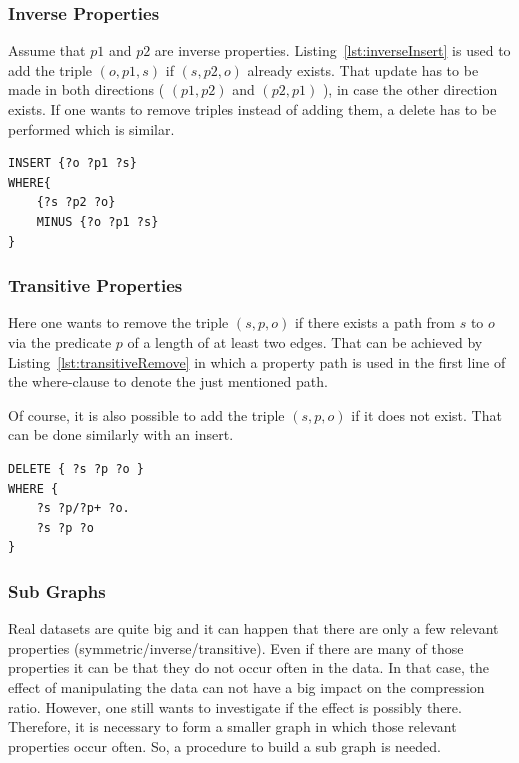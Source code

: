 \subsubsection{Inverse Properties}

Assume that $ p1 $ and $ p2 $ are inverse properties. Listing~\ref{lst:inverseInsert} is used to add the triple $(o,p1,s)$ if $(s,p2,o)$ already exists. That update has to be made in both directions ( $(p1,p2)$ and $(p2,p1)$ ), in case the other direction exists. If one wants to remove triples instead of adding them, a delete has to be performed which is similar.

\begin{lstlisting}[captionpos=b, caption=SPARQL update for adding triples with the inverse properties p1 and p2., label=lst:inverseInsert,
basicstyle=\ttfamily,frame=single]
INSERT {?o ?p1 ?s}
WHERE{
	{?s ?p2 ?o}
	MINUS {?o ?p1 ?s}
}
\end{lstlisting}

\subsubsection{Transitive Properties}

Here one wants to remove the triple $(s,p,o)$ if there exists a path from $s$ to $o$ via the predicate $p$ of a length of at least two edges. That can be achieved by Listing~\ref{lst:transitiveRemove} in which a property path is used in the first line of the where-clause to denote the just mentioned path.

Of course, it is also possible to add the triple $(s,p,o)$ if it does not exist. That can be done similarly with an insert.

\begin{lstlisting}[captionpos=b, caption=SPARQL update for removing triples with the transitive property p., label=lst:transitiveRemove,
basicstyle=\ttfamily,frame=single]
DELETE { ?s ?p ?o }
WHERE { 
	?s ?p/?p+ ?o. 
	?s ?p ?o 
}
\end{lstlisting}

\subsubsection{Sub Graphs}

Real datasets are quite big and it can happen that there are only a few relevant properties (symmetric/inverse/transitive). Even if there are many of those properties it can be that they do not occur often in the data. In that case, the effect of manipulating the data can not have a big impact on the compression ratio. However, one still wants to investigate if the effect is possibly there. Therefore, it is necessary to form a smaller graph in which those relevant properties occur often. So, a procedure to build a sub graph is needed.

